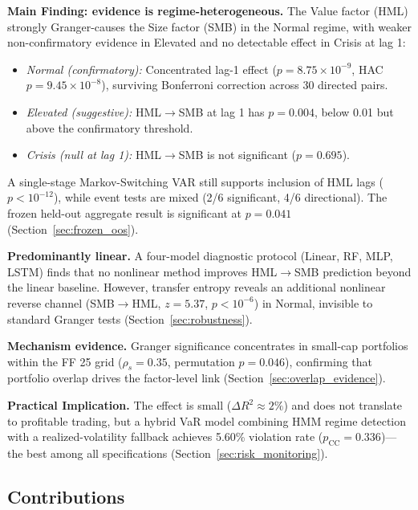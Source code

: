 \documentclass{uai2026}
\begin{document}
\textbf{Main Finding: evidence is regime-heterogeneous.}
The Value factor (HML) strongly Granger-causes the Size factor (SMB) in the
Normal regime, with weaker non-confirmatory evidence in Elevated and no
detectable effect in Crisis at lag 1:
\begin{itemize}
    \item \emph{Normal (confirmatory):} Concentrated lag-1 effect
    ($p = 8.75 \times 10^{-9}$, HAC $p = 9.45 \times 10^{-8}$), surviving
    Bonferroni correction across 30 directed pairs.
    \item \emph{Elevated (suggestive):} HML$\to$SMB at lag 1 has
    $p = 0.004$, below 0.01 but above the confirmatory threshold.
    \item \emph{Crisis (null at lag 1):} HML$\to$SMB is not significant
    ($p = 0.695$).
\end{itemize}
A single-stage Markov-Switching VAR still supports inclusion of HML lags
($p < 10^{-12}$), while event tests are mixed (2/6 significant, 4/6 directional).
The frozen held-out aggregate result is significant at $p = 0.041$
(Section~\ref{sec:frozen_oos}).

\textbf{Predominantly linear.} A four-model diagnostic protocol (Linear, RF,
MLP, LSTM) finds that no nonlinear method improves HML$\to$SMB prediction beyond
the linear baseline. However, transfer entropy reveals an additional nonlinear
reverse channel (SMB$\to$HML, $z = 5.37$, $p < 10^{-6}$) in Normal, invisible
to standard Granger tests (Section~\ref{sec:robustness}).

\textbf{Mechanism evidence.} Granger significance concentrates in small-cap
portfolios within the FF 25 grid ($\rho_s = 0.35$, permutation $p = 0.046$),
confirming that portfolio overlap drives the factor-level link
(Section~\ref{sec:overlap_evidence}).

\textbf{Practical Implication.} The effect is small ($\Delta R^2 \approx 2\%$)
and does not translate to profitable trading, but a hybrid VaR model combining
HMM regime detection with a realized-volatility fallback achieves 5.60\%
violation rate ($p_{\text{CC}} = 0.336$)---the best among all specifications
(Section~\ref{sec:risk_monitoring}).

\subsection{Contributions}
\end{document}

